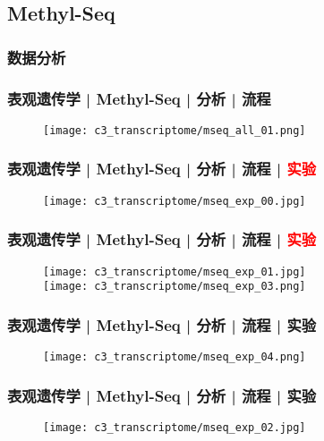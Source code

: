 \subsection{Methyl-Seq}
\subsubsection{数据分析}
\begin{frame}
  \frametitle{表观遗传学 | Methyl-Seq | 分析 | 流程}
  \begin{figure}
    \centering
    \texttt{[image: c3\_transcriptome/mseq\_all\_01.png]}
  \end{figure}
\end{frame}

\begin{frame}
  \frametitle{表观遗传学 | Methyl-Seq | 分析 | 流程 | \textcolor{red}{实验}}
  \begin{figure}
    \centering
    \texttt{[image: c3\_transcriptome/mseq\_exp\_00.jpg]}
  \end{figure}
\end{frame}

\begin{frame}
  \frametitle{表观遗传学 | Methyl-Seq | 分析 | 流程 | \textcolor{red}{实验}}
  \begin{figure}
    \centering
    \texttt{[image: c3\_transcriptome/mseq\_exp\_01.jpg]}\\
    \vspace{1em}
    \texttt{[image: c3\_transcriptome/mseq\_exp\_03.png]}
  \end{figure}
\end{frame}

\begin{frame}
  \frametitle{表观遗传学 | Methyl-Seq | 分析 | 流程 | 实验}
  \begin{figure}
    \centering
    \texttt{[image: c3\_transcriptome/mseq\_exp\_04.png]}
  \end{figure}
\end{frame}

\begin{frame}
  \frametitle{表观遗传学 | Methyl-Seq | 分析 | 流程 | 实验}
  \begin{figure}
    \centering
    \texttt{[image: c3\_transcriptome/mseq\_exp\_02.jpg]}
  \end{figure}
\end{frame}

